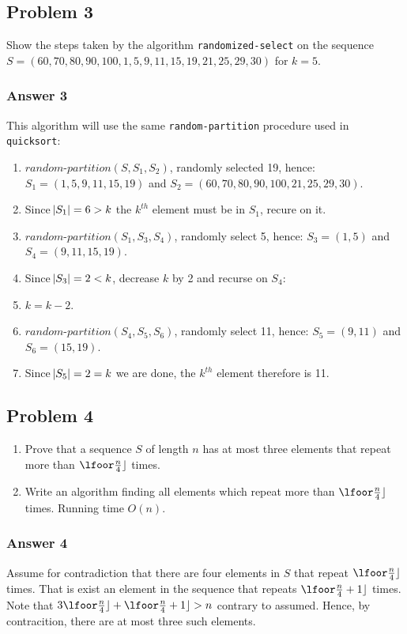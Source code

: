 \documentclass[11pt]{article}
\begin{document}
\subsection{Problem 3}
\label{sec-1-3}
Show the steps taken by the algorithm \texttt{randomized-select} on the sequence
$S = (60, 70, 80, 90, 100, 1, 5, 9, 11, 15, 19, 21, 25, 29, 30)$ for $k = 5$.

\subsubsection{Answer 3}
\label{sec-1-3-1}
This algorithm will use the same \texttt{random-partition} procedure used in
\texttt{quicksort}:
\begin{enumerate}
\item $\textit{random-partition}(S, S_1, S_2)$, randomly selected 19, hence:
$S_1 = (1, 5, 9, 11, 15, 19)$ and 
$S_2 = (60, 70, 80, 90, 100, 21, 25, 29, 30)$.
\item Since $\abs{S_1} = 6 > k$ the $k^{th}$ element must be in $S_1$, recure
on it.
\item $\textit{random-partition}(S_1, S_3, S_4)$, randomly select 5, hence:
$S_3 = (1, 5)$ and
$S_4 = (9, 11, 15, 19)$.
\item Since $\abs{S_3} = 2 < k$, decrease $k$ by 2 and recurse on $S_4$:
\item $k = k - 2$.
\item $\textit{random-partition}(S_4, S_5, S_6)$, randomly select 11, hence:
$S_5 = (9, 11)$ and
$S_6 = (15, 19)$.
\item Since $\abs{S_5} = 2 = k$ we are done, the $k^{th}$ element therefore
is 11.
\end{enumerate}

\subsection{Problem 4}
\label{sec-1-4}
\begin{enumerate}
\item Prove that a sequence $S$ of length $n$ has at most three elements that
repeat more than $\lfoor\frac{n}{4}\rfloor$ times.
\item Write an algorithm finding all elements which repeat more than
$\lfoor\frac{n}{4}\rfloor$ times.  Running time $O(n)$.
\end{enumerate}

\subsubsection{Answer 4}
\label{sec-1-4-1}
Assume for contradiction that there are four elements in $S$ that repeat
$\lfoor\frac{n}{4}\rfloor$ times.  That is exist an element in the sequence
that repeats $\lfoor\frac{n}{4} + 1\rfloor$ times.  Note that
$3\lfoor\frac{n}{4}\rfloor + \lfoor\frac{n}{4} + 1\rfloor > n$ contrary to
assumed.  Hence, by contracition, there are at most three such elements.
\end{document}
